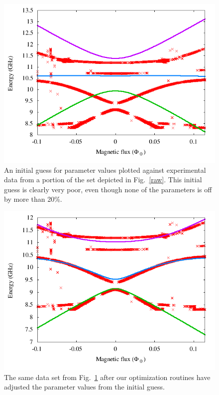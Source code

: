 \documentclass[twocolumn]{revtex4}
\begin{document}
\begin{figure}
\includegraphics[width=\linewidth]{CPBL-prefit.png}
\caption{ An initial guess for parameter values plotted against
  experimental data from a portion of the set depicted in
  Fig.~\ref{raw}. This initial guess is clearly very poor, even
  though none of the parameters is off by more than 20\%.}
\label{pre-fit}
\end{figure}

\begin{figure}
\includegraphics[width=\linewidth]{CPBL-postfit.png}
\caption{ The same data set from Fig.~\ref{pre-fit} after our
  optimization routines have adjusted the parameter values from the
  initial guess.}
\label{post-fit}
\end{figure}
\end{document}
